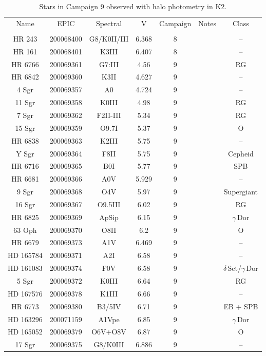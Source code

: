 \begin{table*}
\caption{Stars in Campaign 9 observed with halo photometry in K2.\label{table_1}}
\begin{tabular}{ccccccc}
\hline \hline
Name & EPIC & Spectral & V & Campaign & Notes & Class \\
 &  &  &  &  &  &  \\
\hline
HR 243 & 200068400 & G8/K0II/III & 6.368 & 8 &  & -- \\
HR 161 & 200068401 & K3III & 6.407 & 8 &  & -- \\
HR 6766 & 200069361 & G7:III & 4.56 & 9 &  & RG \\
HR 6842 & 200069360 & K3II & 4.627 & 9 &  & -- \\
4 Sgr & 200069357 & A0 & 4.724 & 9 &  & -- \\
11 Sgr & 200069358 & K0III & 4.98 & 9 &  & RG \\
7 Sgr & 200069362 & F2II-III & 5.34 & 9 &  & RG \\
15 Sgr & 200069359 & O9.7I & 5.37 & 9 &  & O \\
HR 6838 & 200069363 & K2III & 5.75 & 9 &  & -- \\
Y Sgr & 200069364 & F8II & 5.75 & 9 &  & Cepheid \\
HR 6716 & 200069365 & B0I & 5.77 & 9 &  & SPB \\
HR 6681 & 200069366 & A0V & 5.929 & 9 &  & -- \\
9 Sgr & 200069368 & O4V & 5.97 & 9 &  & Supergiant \\
16 Sgr & 200069367 & O9.5III & 6.02 & 9 &  & RG \\
HR 6825 & 200069369 & ApSip & 6.15 & 9 &  & $\gamma\,\text{Dor}$ \\
63 Oph & 200069370 & O8II & 6.2 & 9 &  & O \\
HR 6679 & 200069373 & A1V & 6.469 & 9 &  & -- \\
HD 165784 & 200069371 & A2I & 6.58 & 9 &  & -- \\
HD 161083 & 200069374 & F0V & 6.58 & 9 &  & $\delta\,\text{Sct}$/$\gamma\,\text{Dor}$ \\
5 Sgr & 200069372 & K0III & 6.64 & 9 &  & RG \\
HD 167576 & 200069378 & K1III & 6.66 & 9 &  & -- \\
HR 6773 & 200069380 & B3/5IV & 6.71 & 9 &  & EB + SPB \\
HD 163296 & 200071159 & A1Vpe & 6.85 & 9 &  & $\gamma\,\text{Dor}$ \\
HD 165052 & 200069379 & O6V+O8V & 6.87 & 9 &  & O \\
17 Sgr & 200069375 & G8/K0III & 6.886 & 9 &  & -- \\
\hline
\end{tabular}
\end{table*}
